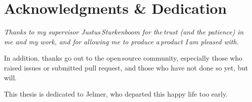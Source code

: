 
\begingroup
  \let\clearpage\relax
  \let\cleardoublepage\relax
  \chapter*{Acknowledgments \& Dedication}

  \itshape
  Thanks to my supervisor Justus\,Sturkenboom for the\,trust (and
    the patience) in me and my work, and for allowing me to produce
    a\,product I\,am pleased with.

  \medskip
  \noindent In addition, thanks go out to the open\,source community,
    especially those who raised issues or submitted pull request, and those
    who have not done so yet, but will.

  \medskip
  \noindent This thesis is dedicated to Jelmer, who departed this happy life
    too early.
\endgroup
